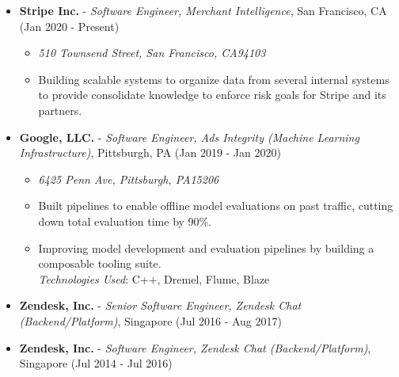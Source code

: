 \begin{itemize}
\tightlist
\item
  \textbf{Stripe Inc.} - \emph{Software Engineer, Merchant
  Intelligence}, San Francisco, CA \hfill (Jan 2020 - Present)

  \begin{itemize}
  \tightlist
  \item
    \emph{510 Townsend Street, San Francisco, CA94103}
  \item
    Building scalable systems to organize data from several internal
    systems to provide consolidate knowledge to enforce risk goals for
    Stripe and its partners.
  \end{itemize}
\item
  \textbf{Google, LLC.} - \emph{Software Engineer, Ads Integrity
  (Machine Learning Infrastructure)}, Pittsburgh, PA \hfill (Jan 2019 -
  Jan 2020)

  \begin{itemize}
  \tightlist
  \item
    \emph{6425 Penn Ave, Pittsburgh, PA15206}
  \item
    Built pipelines to enable offline model evaluations on past traffic,
    cutting down total evaluation time by 90\%.
  \item
    Improving model development and evaluation pipelines by building a
    composable tooling suite.\\
    \emph{Technologies Used}: C++, Dremel, Flume, Blaze
  \end{itemize}
\item
  \textbf{Zendesk, Inc.} - \emph{Senior Software Engineer, Zendesk Chat
  (Backend/Platform)}, Singapore \hfill (Jul 2016 - Aug 2017)
\item
  \textbf{Zendesk, Inc.} - \emph{Software Engineer, Zendesk Chat
  (Backend/Platform)}, Singapore \hfill (Jul 2014 - Jul 2016)


\end{itemize}
